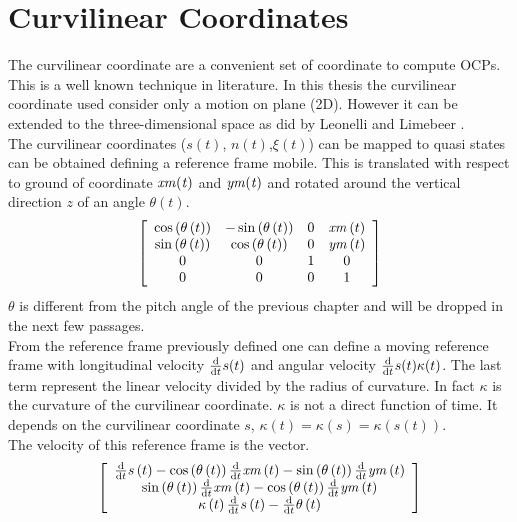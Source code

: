 \section{Curvilinear Coordinates}
%
The curvilinear coordinate are a convenient set of coordinate to compute OCPs. This is a well known technique in literature. In this thesis the curvilinear coordinate used consider only a motion on plane (2D). However it can be extended to the three-dimensional space as did by Leonelli and Limebeer \cite{leonelli2019optimal}.\\
%
The curvilinear coordinates ($s(t)$, $n(t)$,$\xi(t)$) can be mapped to quasi states can be obtained defining a reference frame mobile. This is translated with respect to ground of coordinate $\it xm(t)$ and $\it ym(t)$ and rotated around the vertical direction $z$ of an angle $\theta(t)$.
%
\begin{equation}
\left[ \begin{array}{cccc} 
    \cos \left( \theta \left( t \right) \right) &-\sin \left( \theta \left( t \right)  \right) &0&{\it xm}\left( t \right) \\ 
    \sin \left( \theta \left( t\right)  \right) &\cos \left( \theta \left( t \right)  \right) &0&{\it ym} \left( t \right) \\ 
    0&0&1&0\\ 
    0&0&0&1
\end{array} \right]    
\end{equation}
%
$\theta$ is different from the pitch angle of the previous chapter and will be dropped in the next few passages.\\
From the reference frame previously defined one can define a moving reference frame with longitudinal velocity $\frac {\rm d}{{\rm d}t} s(t)$ and angular velocity $\frac {\rm d}{{\rm d}t} s(t) \kappa(t)$. The last term represent the linear velocity divided by the radius of curvature. In fact $\kappa$ is the curvature of the curvilinear coordinate. $\kappa$ is not a direct function of time. It depends on the curvilinear coordinate $s$, $\kappa(t)=\kappa(s)=\kappa(s(t))$.\\
The velocity of this reference frame is the vector.
%
\begin{equation}
    \left[ \begin{array}{c} 
        {\frac {\rm d}{{\rm d}t}}s \left( t \right) -\cos \left( \theta \left( t \right)  \right) {\frac {\rm d}{{\rm d}t}}{\it xm} \left( t \right) -\sin \left( \theta \left( t \right) \right) {\frac {\rm d}{{\rm d}t}}{\it ym} \left( t \right) \\
        \sin \left( \theta \left( t \right)  \right) {\frac {\rm d}{{\rm d}t}}{\it xm} \left( t \right) -\cos \left( \theta\left( t \right)  \right) {\frac {\rm d}{{\rm d}t}}{\it ym} \left( t\right) \\ 
        \kappa \left( t \right) {\frac {\rm d}{{\rm d}t}}s \left( t \right) -{\frac {\rm d}{{\rm d}t}}\theta \left( t\right)
    \end{array} \right]    
\end{equation}
